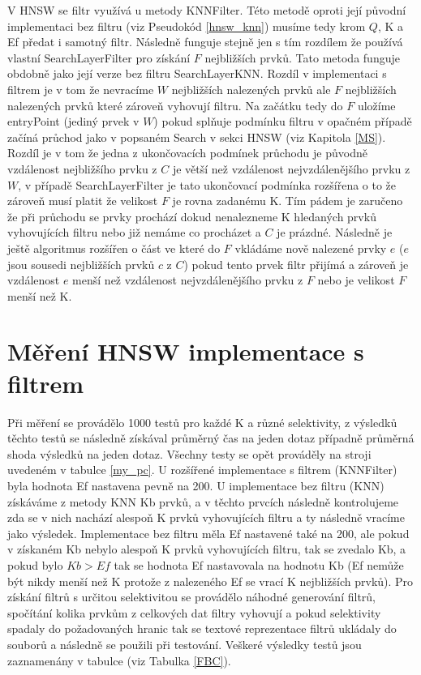 \documentclass[czech,semestral,dept460,male,csharp,cpdeclaration]{diploma}
\begin{document}
		V HNSW se filtr využívá u metody KNNFilter. Této metodě oproti její původní implementaci bez filtru (viz Pseudokód \ref{hnsw_knn}) musíme tedy krom $Q$, K a Ef předat i samotný filtr. Následně funguje stejně jen s tím rozdílem že používá vlastní SearchLayerFilter pro získání $F$ nejbližších prvků. Tato metoda funguje obdobně jako její verze bez filtru SearchLayerKNN. Rozdíl v implementaci s filtrem je v tom že nevracíme $W$ nejbližších nalezených prvků ale $F$ nejbližších nalezených prvků které zároveň vyhovují filtru. Na začátku tedy do $F$ uložíme entryPoint (jediný prvek v $W$) pokud splňuje podmínku filtru v opačném případě začíná průchod jako v popsaném Search v sekci HNSW (viz Kapitola \ref{MS}). Rozdíl je v tom že jedna z ukončovacích podmínek průchodu je původně vzdálenost nejbližšího prvku z $C$ je větší než vzdálenost nejvzdálenějšího prvku z $W$, v případě SearchLayerFilter je tato ukončovací podmínka rozšířena o to že zároveň musí platit že velikost $F$ je rovna zadanému K. Tím pádem je zaručeno že při průchodu se prvky prochází dokud nenalezneme K hledaných prvků vyhovujících filtru nebo již nemáme co procházet a $C$ je prázdné. Následně je ještě algoritmus rozšířen o část ve které do $F$ vkládáme nově nalezené prvky $e$ ($e$ jsou sousedi nejbližších prvků $c$ z $C$) pokud tento prvek filtr přijímá a zároveň je vzdálenost $e$ menší než vzdálenost nejvzdálenějšího prvku z $F$ nebo je velikost $F$ menší než K.
		
		\section{Měření HNSW implementace s filtrem}
		
		Při měření se provádělo 1000 testů pro každé K a různé selektivity, z výsledků těchto testů se následně získával průměrný čas na jeden dotaz případně průměrná shoda výsledků na jeden dotaz. Všechny testy se opět prováděly na stroji uvedeném v tabulce \ref{my_pc}. U rozšířené implementace s filtrem (KNNFilter) byla hodnota Ef nastavena pevně na 200. U implementace bez filtru (KNN) získáváme z metody KNN Kb prvků, a v těchto prvcích následně kontrolujeme zda se v nich nachází alespoň K prvků vyhovujících filtru a ty následně vracíme jako výsledek. Implementace bez filtru měla Ef nastavené také na 200, ale pokud v získaném Kb nebylo alespoň K prvků vyhovujících filtru, tak se zvedalo Kb, a pokud bylo $Kb > Ef$ tak se hodnota Ef nastavovala na hodnotu Kb (Ef nemůže být nikdy menší než K protože z nalezeného Ef se vrací K nejbližších prvků). Pro získání filtrů s určitou selektivitou se provádělo náhodné generování filtrů, spočítání kolika prvkům z celkových dat filtry vyhovují a pokud selektivity spadaly do požadovaných hranic tak se textové reprezentace filtrů ukládaly do souborů a následně se použili při testování. Veškeré výsledky testů jsou zaznamenány v tabulce (viz Tabulka \ref{FBC}).
		
\end{document}
